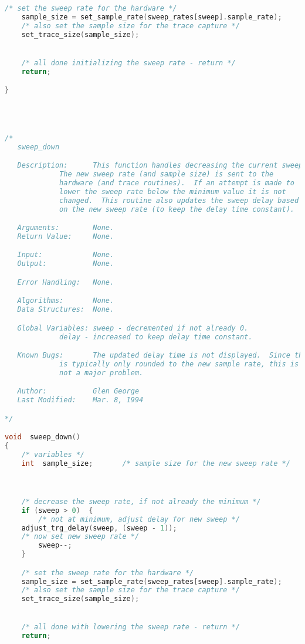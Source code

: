 \begin{lstlisting}[language=C]
    /* set the sweep rate for the hardware */
    sample_size = set_sample_rate(sweep_rates[sweep].sample_rate);
    /* also set the sample size for the trace capture */
    set_trace_size(sample_size);


    /* all done initializing the sweep rate - return */
    return;

}




/*
   sweep_down

   Description:      This function handles decreasing the current sweep rate.
   		     The new sweep rate (and sample size) is sent to the
		     hardware (and trace routines).  If an attempt is made to
		     lower the sweep rate below the minimum value it is not
		     changed.  This routine also updates the sweep delay based
		     on the new sweep rate (to keep the delay time constant).

   Arguments:        None.
   Return Value:     None.

   Input:            None.
   Output:           None.

   Error Handling:   None.

   Algorithms:       None.
   Data Structures:  None.

   Global Variables: sweep - decremented if not already 0.
   		     delay - increased to keep delay time constant.

   Known Bugs:       The updated delay time is not displayed.  Since the time
   		     is typically only rounded to the new sample rate, this is
		     not a major problem.

   Author:           Glen George
   Last Modified:    Mar. 8, 1994

*/

void  sweep_down()
{
    /* variables */
    int  sample_size;		/* sample size for the new sweep rate */



    /* decrease the sweep rate, if not already the minimum */
    if (sweep > 0)  {
        /* not at minimum, adjust delay for new sweep */
	adjust_trg_delay(sweep, (sweep - 1));
	/* now set new sweep rate */
        sweep--;
    }

    /* set the sweep rate for the hardware */
    sample_size = set_sample_rate(sweep_rates[sweep].sample_rate);
    /* also set the sample size for the trace capture */
    set_trace_size(sample_size);


    /* all done with lowering the sweep rate - return */
    return;


\end{lstlisting}
